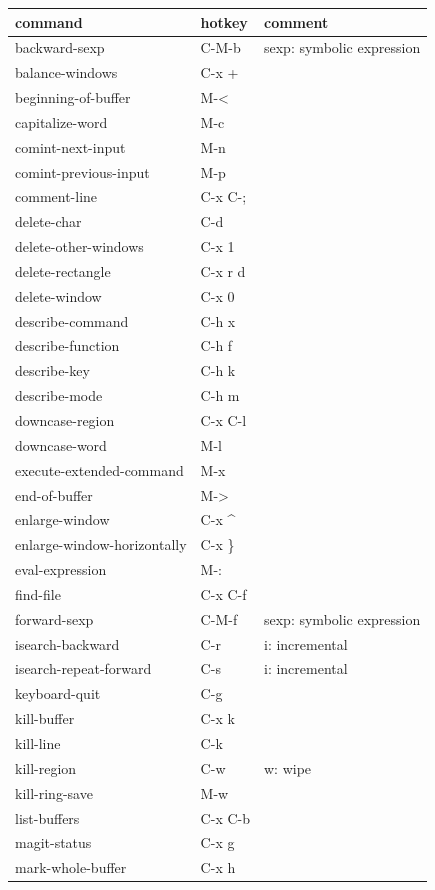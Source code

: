 \documentclass[11pt]{article}
\date{\today}
\title{}
\begin{document}
\tableofcontents

\begin{center}
\begin{tabular}{lll}
command & hotkey & comment\\
\hline
backward-sexp & C-M-b & sexp: symbolic expression\\
balance-windows & C-x + & \\
beginning-of-buffer & M-< & \\
capitalize-word & M-c & \\
comint-next-input & M-n & \\
comint-previous-input & M-p & \\
comment-line & C-x C-; & \\
delete-char & C-d & \\
delete-other-windows & C-x 1 & \\
delete-rectangle & C-x r d & \\
delete-window & C-x 0 & \\
describe-command & C-h x & \\
describe-function & C-h f & \\
describe-key & C-h k & \\
describe-mode & C-h m & \\
downcase-region & C-x C-l & \\
downcase-word & M-l & \\
execute-extended-command & M-x & \\
end-of-buffer & M-> & \\
enlarge-window & C-x \^{} & \\
enlarge-window-horizontally & C-x \} & \\
eval-expression & M-: & \\
find-file & C-x C-f & \\
forward-sexp & C-M-f & sexp: symbolic expression\\
isearch-backward & C-r & i: incremental\\
isearch-repeat-forward & C-s & i: incremental\\
keyboard-quit & C-g & \\
kill-buffer & C-x k & \\
kill-line & C-k & \\
kill-region & C-w & w: wipe\\
kill-ring-save & M-w & \\
list-buffers & C-x C-b & \\
magit-status & C-x g & \\
mark-whole-buffer & C-x h & \\

\end{tabular}
\end{center}
\end{document}
